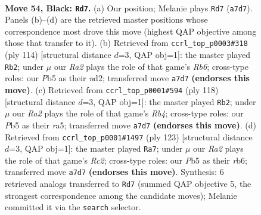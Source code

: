 \documentclass[11pt]{article}
\begin{document}
\clearpage

\begin{figure}[p]\centering
\begin{subfigure}{0.46\textwidth}\centering
\resizebox{\linewidth}{!}{%
\newchessgame
\chessboard[
  setfen={8/r7/5K2/1p5k/8/8/8/8 b - - 3 54},
  showmover=false,
  pgfstyle=straightmove, color=movearrow, markmove={a7-d7}
]}
\caption{}
\end{subfigure}\hfill
\begin{subfigure}{0.46\textwidth}\centering
\resizebox{\linewidth}{!}{%
\newchessgame
\chessboard[
  setfen={8/8/1R6/6k1/8/6K1/3n4/8 w - - 3 58},
  showmover=false,
  pgfstyle=straightmove, color=movearrow, markmove={b6-b2}
]}
\caption{}
\end{subfigure}
\\[4pt]
\begin{subfigure}{0.46\textwidth}\centering
\resizebox{\linewidth}{!}{%
\newchessgame
\chessboard[
  setfen={2k5/8/4K3/r7/1R6/8/8/8 w - - 0 60},
  showmover=false,
  pgfstyle=straightmove, color=movearrow, markmove={b4-b2}
]}
\caption{}
\end{subfigure}\hfill
\begin{subfigure}{0.46\textwidth}\centering
\resizebox{\linewidth}{!}{%
\newchessgame
\chessboard[
  setfen={8/2r5/1R6/8/6k1/8/3K4/8 b - - 4 62},
  showmover=false,
  pgfstyle=straightmove, color=movearrow, markmove={c7-a7}
]}
\caption{}
\end{subfigure}
\caption{\textbf{Move 54, Black: \texttt{Rd7}.} (a) Our position; Melanie plays \texttt{Rd7} (\texttt{a7d7}). Panels (b)--(d) are the retrieved master positions whose correspondence most drove this move (highest QAP objective among those that transfer to it). (b) Retrieved from \texttt{ccrl\_top\_p0003\#318} (ply 114) [structural distance $d$=3, QAP obj=1]: the master played \texttt{Rb2}; under $\mu$ our \emph{Ra2} plays the role of that game's \emph{Rb6}; cross-type roles: our \emph{P}b5 as their \emph{n}d2; transferred move \texttt{a7d7} \textbf{(endorses this move)}. (c) Retrieved from \texttt{ccrl\_top\_p0001\#594} (ply 118) [structural distance $d$=3, QAP obj=1]: the master played \texttt{Rb2}; under $\mu$ our \emph{Ra2} plays the role of that game's \emph{Rb4}; cross-type roles: our \emph{P}b5 as their \emph{r}a5; transferred move \texttt{a7d7} \textbf{(endorses this move)}. (d) Retrieved from \texttt{ccrl\_top\_p0001\#1497} (ply 123) [structural distance $d$=3, QAP obj=1]: the master played \texttt{Ra7}; under $\mu$ our \emph{Ra2} plays the role of that game's \emph{Rc2}; cross-type roles: our \emph{P}b5 as their \emph{r}b6; transferred move \texttt{a7d7} \textbf{(endorses this move)}. Synthesis: 6 retrieved analogs transferred to \texttt{Rd7} (summed QAP objective 5, the strongest correspondence among the candidate moves); Melanie committed it via the \texttt{search} selector.}
\label{fig:thought-m107}
\end{figure}
\end{document}
